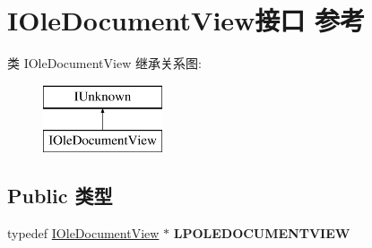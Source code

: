 \hypertarget{interface_i_ole_document_view}{}\section{I\+Ole\+Document\+View接口 参考}
\label{interface_i_ole_document_view}
类 I\+Ole\+Document\+View 继承关系图\+:\begin{figure}[H]
\begin{center}
\leavevmode
\includegraphics[height=2.000000cm]{interface_i_ole_document_view}
\end{center}
\end{figure}
\subsection*{Public 类型}
\begin{DoxyCompactItemize}
\item 
\mbox{\label{interface_i_ole_document_view_aadc2dee8de00b7c9ffbd9c9858c70140}} 
typedef \hyperlink{interface_i_ole_document_view}{I\+Ole\+Document\+View} $\ast$ {\bfseries L\+P\+O\+L\+E\+D\+O\+C\+U\+M\+E\+N\+T\+V\+I\+EW}
\end{DoxyCompactItemize}
